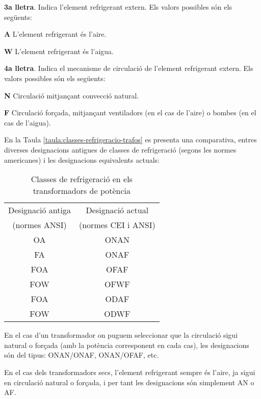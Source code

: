 \textbf{3a lletra}. Indica l'element refrigerant extern. Els valors
possibles s\'{o}n els seg\"{u}ents:
\begin{list}{}
   {\setlength{\labelwidth}{10mm} \setlength{\leftmargin}{10mm} \setlength{\labelsep}{2mm}}
   \item[\textbf{A}] L'element refrigerant \'{e}s l'aire.
   \item[\textbf{W}] L'element refrigerant \'{e}s l'aigua.
\end{list}
 

\textbf{4a lletra}. Indica el mecanisme de circulaci\'{o} de l'element
refrigerant extern. Els valors possibles s\'{o}n els seg\"{u}ents:
\begin{list}{}
   {\setlength{\labelwidth}{10mm} \setlength{\leftmargin}{10mm} \setlength{\labelsep}{2mm}}
   \item[\textbf{N}] Circulaci\'{o} mitjan\c{c}ant convecci\'{o} natural.
   \item[\textbf{F}] Circulaci\'{o} for\c{c}ada, mitjan\c{c}ant ventiladors (en el cas de
   l'aire) o bombes (en el cas de l'aigua).
\end{list}
 

En la Taula \vref{taula:classes-refrigeracio-trafos} es presenta una
comparativa, entres diverses designacions antigues de classes de
refrigeraci\'{o} (segons les normes americanes) i les designacions
equivalents actuals:
\begin{table}[htb]
   \caption{\label{taula:classes-refrigeracio-trafos}
   Classes de refrigeraci\'{o} en els transformadors de pot\`{e}ncia}
   \begin{center}\begin{tabular}{cc}
   \toprule[1pt]
   Designaci\'{o} antiga & Designaci\'{o} actual \\
   (normes \textsf{\textsf{ANSI}})     & (normes \textsf{\textsf{CEI}} i
   \textsf{\textsf{ANSI}}) \\
   \midrule
   OA & ONAN   \\
   FA & ONAF   \\
   FOA & OFAF  \\
   FOW & OFWF  \\
   FOA & ODAF  \\
   FOW & ODWF \\
   \bottomrule[1pt]
   \end{tabular} \end{center}
\end{table}

En el cas d'un transformador on puguem seleccionar que la circulaci\'{o}
sigui natural o for\c{c}ada (amb la pot\`{e}ncia corresponent en cada cas),
les designacions s\'{o}n del tipus: ONAN/ONAF, ONAN/OFAF, etc.

En el cas dels transformadors secs, l'element refrigerant sempre \'{e}s
l'aire, ja sigui en circulaci\'{o} natural o for\c{c}ada, i per tant les
designacions s\'{o}n simplement AN o AF.
